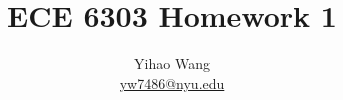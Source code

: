 \documentclass[en, 12pt, a4paper]{0elegantpaper}
\author{Yihao Wang \\ \href{mailto:yw7486@nyu.edu}{yw7486@nyu.edu}} %
\newcommand{\HWIndex}{1}
\begin{document}
\title{ECE 6303 Homework \HWIndex}
\maketitle


\end{document}
